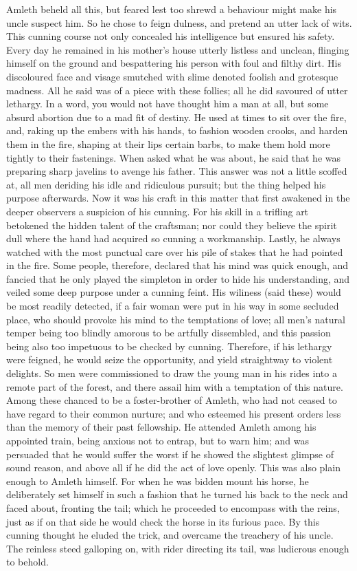 \documentclass[10pt,a4paper]{report}
\begin{document}
Amleth beheld all this, but feared lest too shrewd a behaviour might make his uncle suspect him. So he chose to feign dulness, and pretend an utter lack of wits. This cunning course not only concealed his intelligence but ensured his safety. Every day he remained in his mother's house utterly listless and unclean, flinging himself on the ground and bespattering his person with foul and filthy dirt. His discoloured face and visage smutched with slime denoted foolish and grotesque madness. All he said was of a piece with these follies; all he did savoured of utter lethargy. In a word, you would not have thought him a man at all, but some absurd abortion due to a mad fit of destiny. He used at times to sit over the fire, and, raking up the embers with his hands, to fashion wooden crooks, and harden them in the fire, shaping at their lips certain barbs, to make them hold more tightly to their fastenings. When asked what he was about, he said that he was preparing sharp javelins to avenge his father. This answer was not a little scoffed at, all men deriding his idle and ridiculous pursuit; but the thing helped his purpose afterwards. Now it was his craft in this matter that first awakened in the deeper observers a suspicion of his cunning. For his skill in a trifling art betokened the hidden talent of the craftsman; nor could they believe the spirit dull where the hand had acquired so cunning a workmanship. Lastly, he always watched with the most punctual care over his pile of stakes that he had pointed in the fire. Some people, therefore, declared that his mind was quick enough, and fancied that he only played the simpleton in order to hide his understanding, and veiled some deep purpose under a cunning feint. His wiliness (said these) would be most readily detected, if a fair woman were put in his way in some secluded place, who should provoke his mind to the temptations of love; all men's natural temper being too blindly amorous to be artfully dissembled, and this passion being also too impetuous to be checked by cunning. Therefore, if his lethargy were feigned, he would seize the opportunity, and yield straightway to violent delights. So men were commissioned to draw the young man in his rides into a remote part of the forest, and there assail him with a temptation of this nature. Among these chanced to be a foster-brother of Amleth, who had not ceased to have regard to their common nurture; and who esteemed his present orders less than the memory of their past fellowship. He attended Amleth among his appointed train, being anxious not to entrap, but to warn him; and was persuaded that he would suffer the worst if he showed the slightest glimpse of sound reason, and above all if he did the act of love openly. This was also plain enough to Amleth himself. For when he was bidden mount his horse, he deliberately set himself in such a fashion that he turned his back to the neck and faced about, fronting the tail; which he proceeded to encompass with the reins, just as if on that side he would check the horse in its furious pace. By this cunning thought he eluded the trick, and overcame the treachery of his uncle. The reinless steed galloping on, with rider directing its tail, was ludicrous enough to behold.\\
\end{document}
